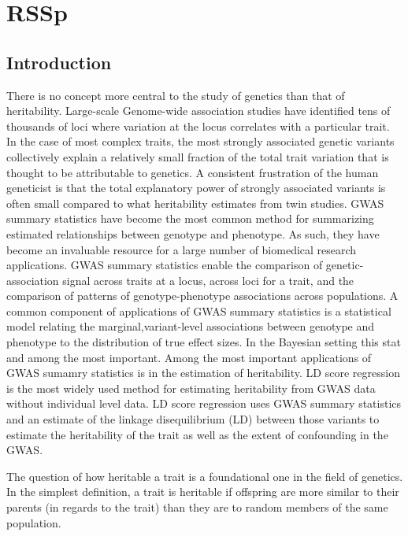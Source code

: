 \chapter{RSSp}



\section{Introduction}\label{sec:org3c6cf58}

There is no concept more central to the study of genetics than that of heritability.
Large-scale Genome-wide association studies have identified tens of thousands of loci where variation at the locus correlates with a particular trait.
In the case of most complex traits, the most strongly associated genetic variants collectively explain a relatively small fraction of the total trait variation that is thought to be attributable to genetics.
A consistent frustration of the human geneticist is that the total explanatory power of strongly associated variants is often small compared to what heritability estimates from twin studies.
GWAS summary statistics have become the most common method for summarizing estimated relationships between genotype and phenotype.
As such, they have become an invaluable resource for a large number of biomedical research applications\cite{Lyon_2020}.  GWAS summary statistics enable the comparison of genetic-association signal across traits at a locus\cite{phewas}, across loci for a trait\cite{firstGWAS}, and the comparison of patterns of genotype-phenotype associations across populations\cite{Rosenberg_2010}.
A common component of  applications of GWAS summary statistics is a statistical model relating the marginal,variant-level associations between genotype and phenotype to the distribution of true effect sizes.  In the Bayesian setting this stat and among the most important.  Among the most important applications of GWAS sumamry statistics is in the estimation of heritability. LD score regression is the most widely used method for estimating heritability from GWAS data without individual level data.  LD score regression uses GWAS summary statistics and an estimate of the linkage disequilibrium (LD) between those variants to estimate the heritability of the trait as well as the extent of confounding in the GWAS\cite{ldsc}.



The question of how heritable a trait is a foundational one in the field of genetics. In the simplest definition, a trait is heritable if offspring are more similar to their parents (in regards to the trait) than they are to random members of the same population.  

